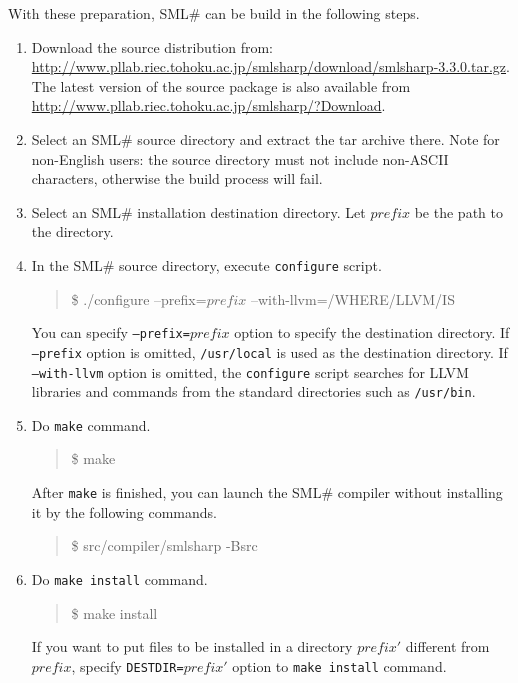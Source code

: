 \documentclass{jbook}
\newcommand{\smlsharp}{SML\#}
\newcommand{\version}{3.3.0}
\newcommand\eurl[1]{{\edef\eurlTMP{{#1}}\expandafter\url\eurlTMP}}
\newenvironment{program}{\begin{quote}\begin{tt}}%
                        {\end{tt}\end{quote}}
\begin{document}
	With these preparation, \smlsharp{} can be build in the
following steps.
\begin{enumerate}
\item Download the source distribution from:
\eurl{http://www.pllab.riec.tohoku.ac.jp/smlsharp/download/smlsharp-\version.tar.gz}.
	The latest version of the source package is also available from
\url{http://www.pllab.riec.tohoku.ac.jp/smlsharp/?Download}.
\item Select an \smlsharp{} source directory and extract the tar archive there.
	Note for non-English users:
the source directory must not include non-ASCII characters,
otherwise the build process will fail.
\item Select an \smlsharp{} installation destination directory.
Let $\mathit{prefix}$ be the path to the directory.
\item
	In the \smlsharp{} source directory, execute {\tt configure} script.
\begin{program}
\$ ./configure --prefix=$\mathit{prefix}$ --with-llvm=/WHERE/LLVM/IS
\end{program}
	You can specify {\tt --prefix=$\mathit{prefix}$} option to specify
the destination directory.
	If {\tt --prefix} option is omitted, {\tt /usr/local} is used as
the destination directory.
	If {\tt --with-llvm} option is omitted, the {\tt configure} script
searches for LLVM libraries and commands from the standard directories
such as {\tt /usr/bin}.

\item
	Do {\tt make} command.
\begin{program}
\$ make
\end{program}
	After {\tt make} is finished,
you can launch the \smlsharp{} compiler
without installing it
by the following commands.
\begin{program}
\$ src/compiler/smlsharp -Bsrc
\end{program}
\item
	Do {\tt make install} command.
\begin{program}
\$ make install
\end{program}
	If you want to put files to be installed in a directory
$\mathit{prefix}'$ different from $\mathit{prefix}$, specify
{\tt DESTDIR=$\mathit{prefix}'$} option to {\tt make install} command.
\end{enumerate}
\end{document}
